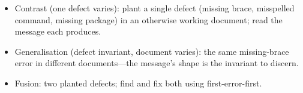 \begin{itemize}
  \item Contrast (one defect varies): plant a single defect (missing
    brace, misspelled command, missing package) in an otherwise working
    document; read the message each produces.
  \item Generalisation (defect invariant, document varies): the same
    missing-brace error in different documents---the message's shape is
    the invariant to discern.
  \item Fusion: two planted defects; find and fix both using
    first-error-first.
\end{itemize}
